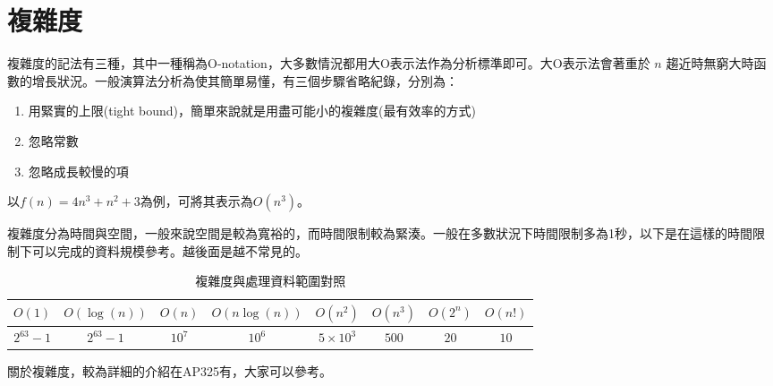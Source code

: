 \section{複雜度}
    複雜度的記法有三種，其中一種稱為O-notation，大多數情況都用大O表示法作為分析標準即可。大O表示法會著重於 $n$ 趨近時無窮大時函數的增長狀況。一般演算法分析為使其簡單易懂，有三個步驟省略紀錄，分別為：

    \begin{enumerate}
        \item 用緊實的上限(tight bound)，簡單來說就是用盡可能小的複雜度(最有效率的方式)
        \item 忽略常數
        \item 忽略成長較慢的項
    \end{enumerate}

    以$f(n)=4n^3+n^2+3$為例，可將其表示為$O(n^3)$。

    複雜度分為時間與空間，一般來說空間是較為寬裕的，而時間限制較為緊湊。一般在多數狀況下時間限制多為1秒，以下是在這樣的時間限制下可以完成的資料規模參考。越後面是越不常見的。

    \begin{table}[h!]
        \centering
        \begin{tabular}{c|c|c|c|c|c|c|c}
            $O(1)$ & $O(\log(n))$ & $O(n)$ & $O(n \log(n))$ & $O(n^2)$ & $O(n^3)$ & $O(2^n)$ & $O(n!)$\\
            \hline
            $2^{63}-1$ & $2^{63}-1$ & $10^7$ & $10^6$ & $5 \times 10^3$ & $500$ & $20$ & $10$
        \end{tabular}
        \caption{複雜度與處理資料範圍對照}
        \label{tab:my_label}
    \end{table}

    關於複雜度，較為詳細的介紹在AP325有，大家可以參考。